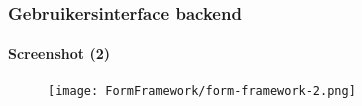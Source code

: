 \begin{frame}[fragile]
	\frametitle{Gebruikersinterface backend}
	\framesubtitle{Screenshot (2)}

	\begin{figure}
		\texttt{[image: FormFramework/form-framework-2.png]}
	\end{figure}

\end{frame}

